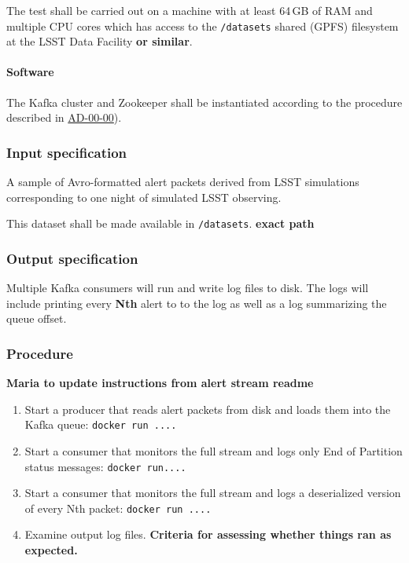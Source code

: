The test shall be carried out on a machine with at least 64\,GB of RAM and
multiple CPU cores which has access to the \texttt{/datasets} shared (GPFS)
filesystem at the LSST Data Facility \textbf{or similar}.

\paragraph{Software}

The Kafka cluster and Zookeeper shall be instantiated according to the 
procedure described in \hyperref[ad-00-00]{AD-00-00}).

\subsubsection{Input specification}

A sample of Avro-formatted alert packets derived from LSST simulations corresponding to one night of simulated LSST observing.

This dataset shall be made available in \texttt{/datasets}.  \textbf{exact path}

\subsubsection{Output specification}

Multiple Kafka consumers will run and write log files to disk.  
The logs will include printing every \textbf{Nth} alert to to the log as well as a log summarizing the queue offset.

\subsubsection{Procedure}
\textbf{Maria to update instructions from alert stream readme}

\begin{enumerate}

	\item{Start a producer that reads alert packets from disk and loads them into the Kafka queue:   \texttt{docker run ....}}

	\item{Start a consumer that monitors the full stream and logs only End of Partition status messages:  \texttt{docker run....}}

	\item{Start a consumer that monitors the full stream and logs a deserialized version of every Nth packet:  \texttt{docker run ....}}

	\item{Examine output log files.  \textbf{Criteria for assessing whether things ran as expected.}}

\end{enumerate}
